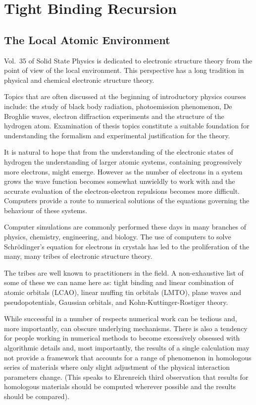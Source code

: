 \chapter{Tight Binding Recursion}
\section{The Local Atomic Environment}
  Vol.~35 of Solid State Physics is dedicated to electronic structure
theory from the point of view of the local environment. This perspective
has a long tradition in physical and chemical electronic structure theory.

  Topics that are often discussed at the beginning of introductory physics courses include:
the study of black body radiation, photoemission phenomenon, De Broghlie waves,
electron diffraction experiments and the structure of the hydrogen atom.
Examination of thesis topics constitute a suitable foundation 
for understanding the formalism and experimental justification for the theory.

  It is natural to hope that from the understanding of the electronic states of hydrogen the
understanding of larger atomic systems, containing progressively more electrons, might emerge. 
However as the number of electrons in a system grows the wave function becomes 
somewhat unwieldly to work with and the accurate evaluation of the 
electron-electron repulsions becomes more difficult. Computers provide a route
to numerical solutions of the equations governing the behaviour of these systems.

Computer simulations are commonly performed these days in many branches of physics, 
chemistry, engineering, and biology. The use of computers to solve Schr\"odinger's 
equation for electrons in crystals has led to the proliferation of the 
many, many tribes of electronic structure theory. 

The tribes are well known to practitioners in the field. A non-exhaustive list
of some of these we can name here as: tight binding and linear combination of atomic orbitals (LCAO), 
linear muffing tin orbitals (LMTO), plane waves and pseudopotentials, Gaussian orbitals, and 
Kohn-Kuttinger-Rostiger theory.

While successful in a number of respects numerical work can be tedious and, more importantly, can obscure underlying
mechanisms. There is also a tendency for people working in numerical methods to become 
excessively obsessed with algorithmic details and, most importantly,
the results of a single calculation may not provide a framework that accounts for a range
of phenomenon in homologous series of materials where only slight adjustment of the physical
interaction parameters change. (This speaks to Ehrenreich third observation that results for homologous materials should be computed
wherever possible and the results should be compared). 

